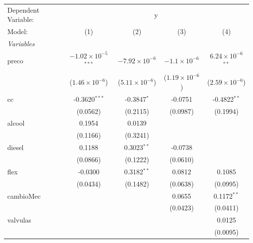 \documentclass{article}
\begin{document}
\begin{table}[H]

\begingroup
\centering
\begin{tabular}{lcccc}
   \tabularnewline \midrule \midrule
   Dependent Variable: & \multicolumn{4}{c}{y}\\
   Model:       & (1)                            & (2)                     & (3)                     & (4)\\  
   \midrule
   \emph{Variables}\\
   preco        & $-1.02\times 10^{-5}$$^{***}$  & $-7.92\times 10^{-6}$   & $-1.1\times 10^{-6}$    & $6.24\times 10^{-6}$$^{**}$\\    
                & ($1.46\times 10^{-6}$)         & ($5.11\times 10^{-6}$)  & ($1.19\times 10^{-6}$)  & ($2.59\times 10^{-6}$)\\    
   cc           & -0.3620$^{***}$                & -0.3847$^{*}$           & -0.0751                 & -0.4822$^{**}$\\   
                & (0.0562)                       & (0.2115)                & (0.0987)                & (0.1994)\\   
   alcool       & 0.1954                         & 0.0139                  &                         &   \\   
                & (0.1166)                       & (0.3241)                &                         &   \\   
   diesel       & 0.1188                         & 0.3023$^{**}$           & -0.0738                 &   \\   
                & (0.0866)                       & (0.1222)                & (0.0610)                &   \\   
   flex         & -0.0300                        & 0.3182$^{**}$           & 0.0812                  & 0.1085\\   
                & (0.0434)                       & (0.1482)                & (0.0638)                & (0.0995)\\   
   cambioMec    &                                &                         & 0.0655                  & 0.1172$^{**}$\\   
                &                                &                         & (0.0423)                & (0.0411)\\   
   valvulas     &                                &                         &                         & 0.0125\\   
                &                                &                         &                         & (0.0095)\\   

\end{tabular}
\end{table}
\end{document}
